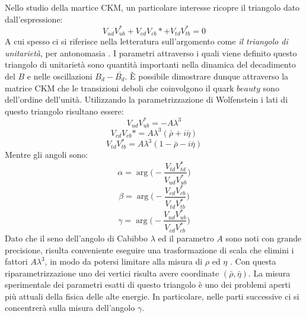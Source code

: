Nello studio della martice CKM, un particolare interesse ricopre il triangolo dato dall'espressione:
\begin{equation}
 V_{ud}V_{ub}^* + V_{cd}V_{cb}* + V_{td}V_{tb}^* = 0
\end{equation}
A cui spesso ci si riferisce nella letteratura sull'argomento come \emph{il triangolo di unitarietà}, per antonomasia \cite{Branco}.
I parametri attraverso i quali viene definito questo triangolo di unitarietà sono quantità importanti nella dinamica del decadimento del $B$ e nelle oscillazioni $B_d - \bar{B_d}$.
È possibile dimostrare dunque attraverso la matrice CKM che le transizioni deboli che coinvolgono il quark $beauty$ sono dell'ordine dell'unità.
Utilizzando la parametrizzazione di Wolfenstein i lati di questo triangolo risultano essere:
\begin{equation}
V_{ud}V_{ub}^* = -A\lambda^3
\end{equation}
\begin{equation}
V_{cd}V_{cb}* = A\lambda^3 (\bar{\rho} + i\bar{\eta})
\end{equation}
\begin{equation}
 V_{td}V_{tb}^* = A\lambda^3 (1-\bar{\rho}-i\bar{\eta})
\end{equation}
Mentre gli angoli sono:
\begin{equation}
 \alpha = \arg \Big(-\frac{V_{td}V^*_{td}}{V_{ud}V^*_{ub}}\Big)
\end{equation}
\begin{equation}
 \beta = \arg \Big(-\frac{V_{cd}V^*_{cb}}{V_{td}V^*_{tb}}\Big)
\end{equation}
\begin{equation}
 \gamma = \arg\Big(-\frac{V_{ud}V_{ub}^*}{V_{cd}V_{cb}^*}\Big)
\end{equation}
Dato che il seno dell'angolo di Cabibbo $\lambda$ ed il parametro $A$ sono noti con grande precisione, risulta conveniente eseguire una trasformazione di scala
che elimini i fattori $A\lambda^3$, in modo da potersi limitare alla misura di $\rho$ ed $\eta$ \cite{BigiSanda}. Con questa riparametrizzazione uno dei vertici risulta avere coordinate 
$(\bar{\rho},\bar{\eta})$. La misura sperimentale dei parametri esatti di questo triangolo è uno dei problemi aperti più attuali della fisica delle alte energie.
In particolare, nelle parti successive ci si concentrerà sulla misura dell'angolo $\gamma$.
